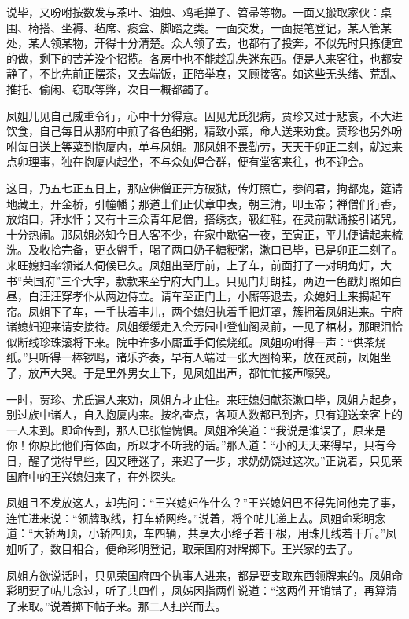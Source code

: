 \documentclass[12pt,oneside]{book}
\begin{document}
说毕，又吩咐按数发与茶叶、油烛、鸡毛掸子、笤帚等物。一面又搬取家伙：桌围、椅搭、坐褥、毡席、痰盒、脚踏之类。一面交发，一面提笔登记，某人管某处，某人领某物，开得十分清楚。众人领了去，也都有了投奔，不似先时只拣便宜的做，剩下的苦差没个招揽。各房中也不能趁乱失迷东西。便是人来客往，也都安静了，不比先前正摆茶，又去端饭，正陪举哀，又顾接客。如这些无头绪、荒乱、推托、偷闲、窃取等弊，次日一概都蠲了。

凤姐儿见自己威重令行，心中十分得意。因见尤氏犯病，贾珍又过于悲哀，不大进饮食，自己每日从那府中煎了各色细粥，精致小菜，命人送来劝食。贾珍也另外吩咐每日送上等菜到抱厦内，单与凤姐。那凤姐不畏勤劳，天天于卯正二刻，就过来点卯理事，独在抱厦内起坐，不与众妯娌合群，便有堂客来往，也不迎会。

这日，乃五七正五日上，那应佛僧正开方破狱，传灯照亡，参阎君，拘都鬼，筵请地藏王，开金桥，引幢幡；那道士们正伏章申表，朝三清，叩玉帝；禅僧们行香，放焰口，拜水忏；又有十三众青年尼僧，搭绣衣，靸红鞋，在灵前默诵接引诸咒，十分热闹。那凤姐必知今日人客不少，在家中歇宿一夜，至寅正，平儿便请起来梳洗。及收拾完备，更衣盥手，喝了两口奶子糖粳粥，漱口已毕，已是卯正二刻了。来旺媳妇率领诸人伺候已久。凤姐出至厅前，上了车，前面打了一对明角灯，大书“荣国府”三个大字，款款来至宁府大门上。只见门灯朗挂，两边一色戳灯照如白昼，白汪汪穿孝仆从两边侍立。请车至正门上，小厮等退去，众媳妇上来揭起车帘。凤姐下了车，一手扶着丰儿，两个媳妇执着手把灯罩，簇拥着凤姐进来。宁府诸媳妇迎来请安接待。凤姐缓缓走入会芳园中登仙阁灵前，一见了棺材，那眼泪恰似断线珍珠滚将下来。院中许多小厮垂手伺候烧纸。凤姐吩咐得一声：“供茶烧纸。”只听得一棒锣鸣，诸乐齐奏，早有人端过一张大圈椅来，放在灵前，凤姐坐了，放声大哭。于是里外男女上下，见凤姐出声，都忙忙接声嚎哭。

一时，贾珍、尤氏遣人来劝，凤姐方才止住。来旺媳妇献茶漱口毕，凤姐方起身，别过族中诸人，自入抱厦内来。按名查点，各项人数都已到齐，只有迎送亲客上的一人未到。即命传到，那人已张惶愧惧。凤姐冷笑道：“我说是谁误了，原来是你！你原比他们有体面，所以才不听我的话。”那人道：“小的天天来得早，只有今日，醒了觉得早些，因又睡迷了，来迟了一步，求奶奶饶过这次。”正说着，只见荣国府中的王兴媳妇来了，在外探头。

凤姐且不发放这人，却先问：“王兴媳妇作什么？”王兴媳妇巴不得先问他完了事，连忙进来说：“领牌取线，打车轿网络。”说着，将个帖儿递上去。凤姐命彩明念道：“大轿两顶，小轿四顶，车四辆，共享大小络子若干根，用珠儿线若干斤。”凤姐听了，数目相合，便命彩明登记，取荣国府对牌掷下。王兴家的去了。

凤姐方欲说话时，只见荣国府四个执事人进来，都是要支取东西领牌来的。凤姐命彩明要了帖儿念过，听了共四件，凤姊因指两件说道：“这两件开销错了，再算清了来取。”说着掷下帖子来。那二人扫兴而去。
\end{document}
